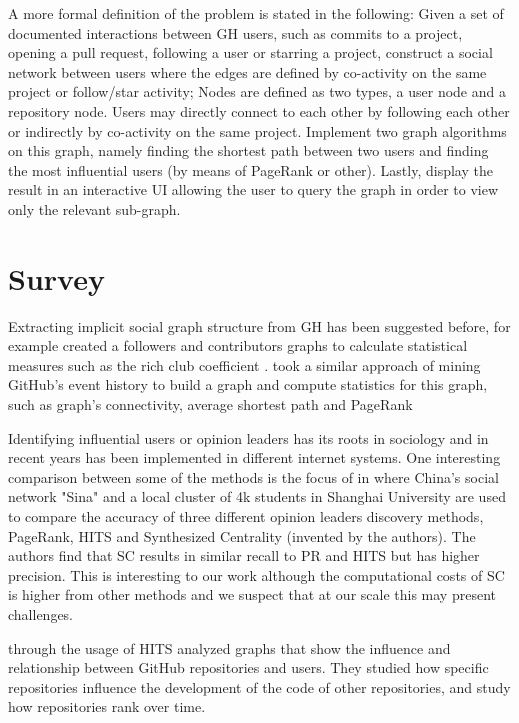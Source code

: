 \documentclass[sigconf,11pt]{acmart}
\begin{document}
A more formal definition of the problem is stated in the following:
Given a set of documented interactions between GH users, such as commits to a project, opening a pull request,
following a user or starring a project, construct a social network between users where the edges are defined by
co-activity on the same project or follow/star activity; Nodes are defined as two types, a user node and a
repository node.
Users may directly connect to each other by following each other or indirectly by co-activity on the same project.
Implement two graph algorithms on this graph, namely finding the shortest path between two users and finding the most influential users
(by means of PageRank or other).
Lastly, display the result in an interactive UI allowing the user to query the graph in order to view only the relevant sub-graph.

\section*{Survey}
Extracting implicit social graph structure from GH has been suggested before,
for example \citeauthor{coding-together} \cite{coding-together} created a followers and contributors graphs
to calculate statistical measures such as the rich club coefficient \cite{wiki:rich-club-coefficient}.
\citeauthor{network-structure-social-coding} \cite{network-structure-social-coding} took a similar approach
of mining GitHub's event history to build a graph and compute statistics for this graph, such as
graph's connectivity, average shortest path and PageRank\cite{pagerank}

Identifying influential users or opinion leaders has its roots in sociology and in recent years has been
implemented in different internet systems.
One interesting comparison
between some of the methods is the focus of \citeauthor{identifying-top-n} in \cite{identifying-top-n}
where China's social network "Sina" and a local cluster of 4k students in Shanghai University are used
to compare the accuracy of three different opinion leaders discovery methods,
PageRank, HITS\cite{hits} and Synthesized Centrality (invented by the authors).
The authors find that SC results in similar recall to PR and HITS but has higher precision.
This is interesting to our work although the computational costs of SC is higher from other methods and we
suspect that at our scale this may present challenges.

\citeauthor{influence-analysis-of-github-repositories} \cite{influence-analysis-of-github-repositories}
through the usage of HITS analyzed graphs that show the influence and relationship between GitHub
repositories and users.
They studied how specific repositories influence the development of the code of other repositories,
and study how repositories rank over time.
\end{document}

